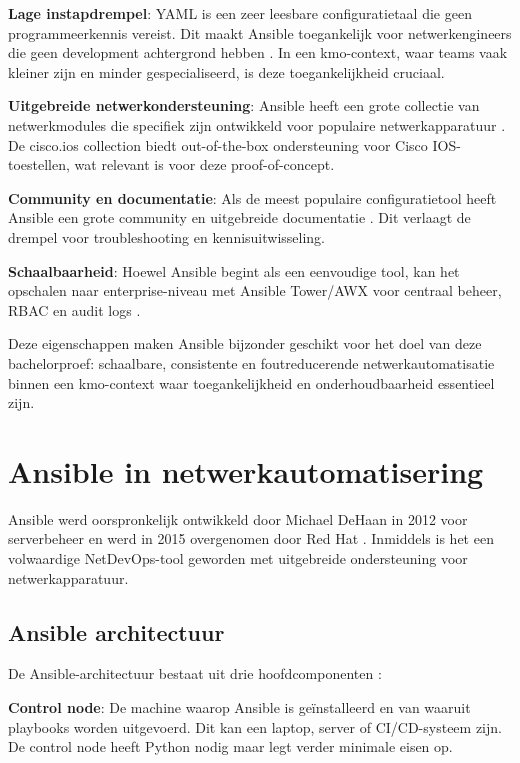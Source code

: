 \textbf{Lage instapdrempel}: YAML is een zeer leesbare configuratietaal die geen programmeerkennis vereist. 
Dit maakt Ansible toegankelijk voor netwerkengineers die geen development achtergrond hebben \autocite{Geerling2020AnsibleDevOps}.
In een kmo-context, waar teams vaak kleiner zijn en minder gespecialiseerd, is deze toegankelijkheid cruciaal.

\textbf{Uitgebreide netwerkondersteuning}: Ansible heeft een grote collectie van netwerkmodules die specifiek zijn ontwikkeld voor populaire netwerkapparatuur \autocite{AnsibleCommunity2024NetworkModules}. 
De cisco.ios collection biedt out-of-the-box ondersteuning voor Cisco IOS-toestellen, wat relevant is voor deze proof-of-concept.

\textbf{Community en documentatie}: Als de meest populaire configuratietool heeft Ansible een grote community en uitgebreide documentatie \autocite{RedHat2024AnsibleDocs}. 
Dit verlaagt de drempel voor troubleshooting en kennisuitwisseling.

\textbf{Schaalbaarheid}: Hoewel Ansible begint als een eenvoudige tool, kan het opschalen naar enterprise-niveau met Ansible Tower/AWX voor centraal beheer, RBAC en audit logs \autocite{RedHat2024TowerDocs}.

Deze eigenschappen maken Ansible bijzonder geschikt voor het doel van deze bachelorproef: schaalbare, consistente en foutreducerende netwerkautomatisatie binnen een kmo-context waar toegankelijkheid en onderhoudbaarheid essentieel zijn.

\section{Ansible in netwerkautomatisering}
\label{sec:ansible}

Ansible werd oorspronkelijk ontwikkeld door Michael DeHaan in 2012 voor serverbeheer en werd in 2015 overgenomen door Red Hat \autocite{Hochstein2017AnsibleUpRunning}.
Inmiddels is het een volwaardige NetDevOps-tool geworden met uitgebreide ondersteuning voor netwerkapparatuur.

\subsection{Ansible architectuur}
\label{subsec:ansible-architectuur}

De Ansible-architectuur bestaat uit drie hoofdcomponenten \autocite{RedHat2024AnsibleDocs}:

\textbf{Control node}: De machine waarop Ansible is geïnstalleerd en van waaruit playbooks worden uitgevoerd. 
Dit kan een laptop, server of CI/CD-systeem zijn. 
De control node heeft Python nodig maar legt verder minimale eisen op.

